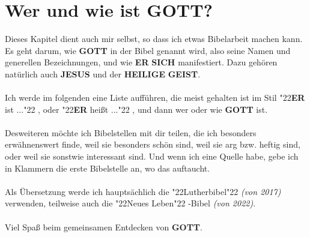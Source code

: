 \documentclass[12pt,a5paper]{article}
\newcommand{\Er}[0]{\textbf{ER}}
\newcommand{\Geist}[0]{\textbf{GEIST}}
\newcommand{\Gott}[0]{\textbf{GOTT}}
\newcommand{\Heilige}[0]{\textbf{HEILIGE}}
\newcommand{\Jesus}[0]{\textbf{JESUS}}
\newcommand{\Sich}[0]{\textbf{SICH}}
\newcommand{\q}[1]{\char"22{#1}\char"22 }
\begin{document}
	\newpage
	\section{Wer und wie ist {\Gott}?}
		Dieses Kapitel dient auch mir selbst,
		so dass ich etwas Bibelarbeit machen kann.
		Es geht darum,
		wie {\Gott} in der Bibel genannt wird,
		also seine Namen und generellen Bezeichnungen,
		und wie {\Er} {\Sich} manifestiert.
		Dazu geh\"oren nat\"urlich auch {\Jesus} und der {\Heilige} {\Geist}.
		\\
		\\
		Ich werde im folgenden eine Liste auff\"uhren,
		die meist gehalten ist im Stil \q{{\Er} ist ...},
		oder \q{{\Er} hei{\ss}t ...},
		und dann wer oder wie {\Gott} ist.
		\\
		\\
		Desweiteren m\"ochte ich Bibelstellen mit dir teilen,
		die ich besonders erw\"ahnenswert finde,
		weil sie besonders sch\"on sind,
		weil sie arg bzw. heftig sind,
		oder weil sie sonstwie interessant sind.
		Und wenn ich eine Quelle habe,
		gebe ich in Klammern die erste Bibelstelle an,
		wo das auftaucht.
		\\
		\\
		Als \"Ubersetzung werde ich haupts\"achlich die \q{Lutherbibel}
		\textit{(von 2017)}
		verwenden,
		teilweise auch die \q{Neues Leben}-Bibel
		\textit{(von 2022)}.
		\\
		\\
		Viel Spa{\ss} beim gemeinsamen Entdecken von {\Gott}.
	
	\newpage
\end{document}

